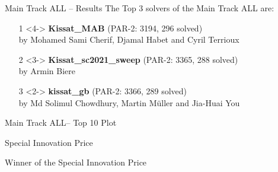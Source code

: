 \documentclass{beamer}
\begin{document}
\begin{frame}{Main Track ALL -- Results}
The Top 3 solvers of the Main Track ALL are:
\begin{itemize}
\item[1]<4-> {\bf Kissat\_MAB} (PAR-2: 3194, 296 solved)\\
by Mohamed Sami Cherif, Djamal Habet and Cyril Terrioux
\item[2]<3-> {\bf Kissat\_sc2021\_sweep} (PAR-2: 3365, 288 solved)  \\
by Armin Biere
\item[3]<2-> {\bf kissat\_gb} (PAR-2: 3366, 289 solved)\\
by Md Solimul Chowdhury, Martin Müller and Jia-Huai You
\end{itemize}
\end{frame}

\begin{frame}{Main Track ALL-- Top 10 Plot}
\centering
\resizebox{.9\textwidth}{!}{%

}
\end{frame}


\begin{frame}{Special Innovation Price}

\begin{block}{Winner of the Special Innovation Price}
\end{block}

\end{frame}
\end{document}
